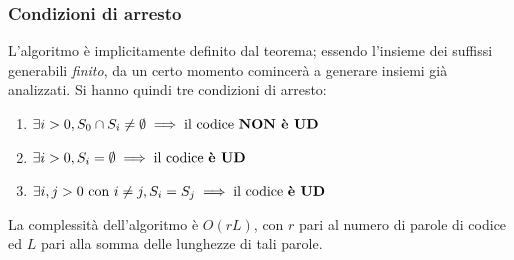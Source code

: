 \subsubsection{Condizioni di arresto}
L'algoritmo è implicitamente definito dal teorema; essendo l'insieme dei suffissi generabili \textit{finito}, da un certo momento comincerà a generare insiemi già analizzati. Si hanno quindi tre condizioni di arresto:
\begin{enumerate}
    \item $\exists i > 0, S_0 \cap S_i \neq \emptyset \implies \text{il codice \textbf{NON è UD}}$
    \item $\exists i > 0, S_i = \emptyset \implies \text{il codice \textbf{è UD}}$
    \item $\exists i, j > 0 \text{ con } i \neq j, S_i = S_j \implies \text{il codice \textbf{è UD}}$
\end{enumerate}
La complessità dell'algoritmo è $O(rL)$, con $r$ pari al numero di parole di codice ed $L$ pari alla somma delle lunghezze di tali parole.

